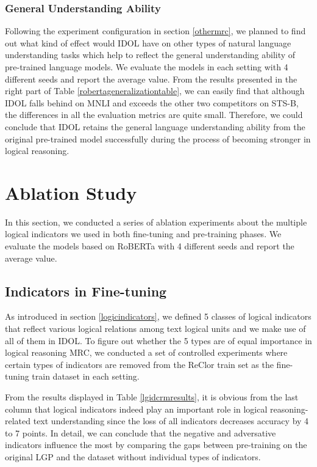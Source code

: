 \documentclass[11pt]{article}
\begin{document}
\subsubsection{General Understanding Ability}
Following the experiment configuration in section \ref {othermrc}, we planned to find out what kind of effect would IDOL have on other types of natural language understanding tasks which help to reflect the general understanding ability of pre-trained language models. We evaluate the models in each setting with 4 different seeds and report the average value. From the results presented in the right part of Table \ref{robertageneralizationtable}, we can easily find that although IDOL falls behind on MNLI and exceeds the other two competitors on STS-B, the differences in all the evaluation metrics are quite small. Therefore, we could conclude that IDOL retains the general language understanding ability from the original pre-trained model successfully during the process of becoming stronger in logical reasoning.





\section{Ablation Study} 

In this section, we conducted a series of ablation experiments about the multiple logical indicators we used in both fine-tuning and pre-training phases. We evaluate the models based on RoBERTa with 4 different seeds and report the average value.

\subsection{Indicators in Fine-tuning}


As introduced in section \ref{logicindicators}, we defined 5 classes of logical indicators that reflect various logical relations among text logical units and we make use of all of them in IDOL. To figure out whether the 5 types are of equal importance in logical reasoning MRC, we conducted a set of controlled experiments where certain types of indicators are removed from the ReClor train set as the fine-tuning train dataset in each setting. 

From the results displayed in Table \ref{lgidcrmresults}, it is obvious from the last column that logical indicators indeed play an important role in logical reasoning-related text understanding since the loss of all indicators decreases accuracy by 4 to 7 points. In detail, we can conclude that the negative and adversative indicators influence the most by comparing the gaps between pre-training on the original LGP and the dataset without individual types of indicators.
\end{document}
